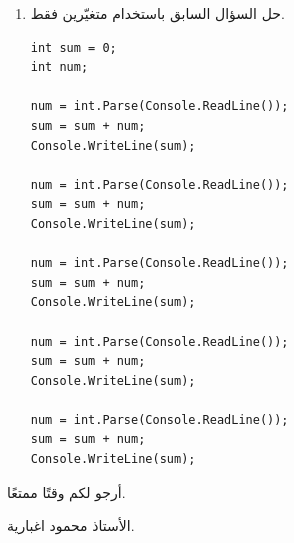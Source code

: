 \documentclass[14pt]{extarticle}
\begin{document}
\begin{enumerate}[itemsep=2em]
\begin{boxSolution}
\begin{english}
\begin{verbatim}
int n3 = int.Parse(Console.ReadLine());
Console.WriteLine(n1 + n2 + n3);

int n4 = int.Parse(Console.ReadLine());
Console.WriteLine(n1 + n2 + n3 + n4);

int n5 = int.Parse(Console.ReadLine());
Console.WriteLine(n1 + n2 + n3 + n4 + n5);
\end{verbatim}
\end{english}
\end{boxSolution}
\clearpage
\fi

\item
حل السؤال السابق باستخدام متغيّرين فقط.
\ifwithsols
\begin{boxSolution}
\begin{english}
\begin{verbatim}
int sum = 0;
int num;

num = int.Parse(Console.ReadLine());
sum = sum + num;
Console.WriteLine(sum);

num = int.Parse(Console.ReadLine());
sum = sum + num;
Console.WriteLine(sum);

num = int.Parse(Console.ReadLine());
sum = sum + num;
Console.WriteLine(sum);

num = int.Parse(Console.ReadLine());
sum = sum + num;
Console.WriteLine(sum);

num = int.Parse(Console.ReadLine());
sum = sum + num;
Console.WriteLine(sum);
\end{verbatim}
\end{english}
\end{boxSolution}
\fi

\end{enumerate}

\vspace{3cm}
\begin{flushleft}
أرجو لكم وقتًا ممتعًا.

الأستاذ محمود اغبارية.
\end{flushleft}
\end{document}
